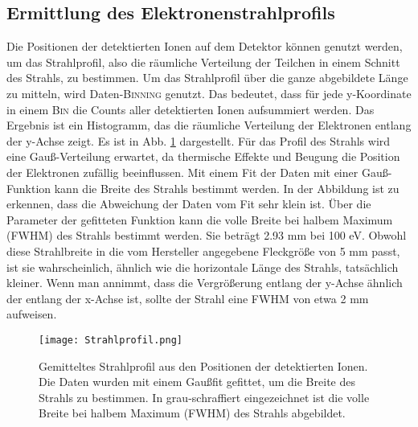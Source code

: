 \subsection{Ermittlung des Elektronenstrahlprofils}
Die Positionen der detektierten Ionen auf dem Detektor können genutzt werden, um das Strahlprofil, also die räumliche Verteilung der Teilchen in einem Schnitt des Strahls, zu bestimmen. Um das Strahlprofil über die ganze abgebildete Länge zu mitteln, wird Daten-\textsc{Binning} genutzt. Das bedeutet, dass für jede y-Koordinate in einem \textsc{Bin} die Counts aller detektierten Ionen aufsummiert werden. Das Ergebnis ist ein Histogramm, das die räumliche Verteilung der Elektronen entlang der y-Achse zeigt. Es ist in Abb. \ref{fig:Strahlprofil} dargestellt. Für das Profil des Strahls wird eine Gauß-Verteilung erwartet, da thermische Effekte und Beugung die Position der Elektronen zufällig beeinflussen. Mit einem Fit der Daten mit einer Gauß-Funktion kann die Breite des Strahls bestimmt werden. In der Abbildung ist zu erkennen, dass die Abweichung der Daten vom Fit sehr klein ist. Über die Parameter der gefitteten Funktion kann die volle Breite bei halbem Maximum (FWHM) des Strahls bestimmt werden. Sie beträgt 2.93 mm bei 100 eV. Obwohl diese Strahlbreite in die vom Hersteller angegebene Fleckgröße von 5 mm passt, ist sie wahrscheinlich, ähnlich wie die horizontale Länge des Strahls, tatsächlich kleiner. Wenn man annimmt, dass die Vergrößerung entlang der y-Achse ähnlich der entlang der x-Achse ist, sollte der Strahl eine FWHM von etwa 2 mm aufweisen.

\begin{figure}
    \centering
    \texttt{[image: Strahlprofil.png]}
    \caption[Gemitteltes Strahlprofil]{Gemitteltes Strahlprofil aus den Positionen der detektierten Ionen. Die Daten wurden mit einem Gaußfit gefittet, um die Breite des Strahls zu bestimmen. In grau-schraffiert eingezeichnet ist die volle Breite bei halbem Maximum (FWHM) des Strahls abgebildet.}
    \label{fig:Strahlprofil} 
\end{figure}
